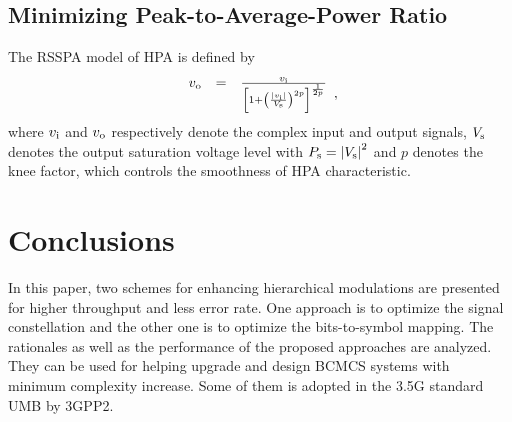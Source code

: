 \documentclass[10pt,fleqn, twocolumn]{IEEEtran}
\begin{document}
\subsection{Minimizing Peak-to-Average-Power Ratio}

The RSSPA model of HPA is defined by
\begin{equation}
\begin{array}{rcl}
v_{\rm o}&=&\frac{v_{\rm i}}{\left[1+\left(\frac{|v_{\rm
i}|}{V_{\rm s}}\right)^{2p}\right]^{\frac{1}{2p}}}
\end{array},\label{RSSPA}
\end{equation}
\noindent where $v_{\rm i}$ and $v_{\rm o}$ respectively denote
the complex input and output signals, $V_{\rm s}$ denotes the
output saturation voltage level with $P_{\rm s}=\left|V_{\rm
s}\right|^2$ and $p$ denotes the knee factor, which controls the
smoothness of HPA characteristic.



\section{Conclusions}
In this paper, two schemes for enhancing hierarchical modulations
are presented for higher throughput and less error rate. One
approach is to optimize the signal constellation and the other one
is to optimize the bits-to-symbol mapping. The rationales as well
as the performance of the proposed approaches are analyzed. They
can be used for helping upgrade and design BCMCS systems with
minimum complexity increase. Some of them is adopted in the 3.5G
standard UMB by 3GPP2. \small


\end{document}
